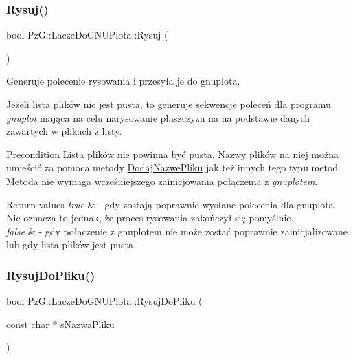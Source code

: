 \subsubsection{\texorpdfstring{Rysuj()}{Rysuj()}}
{\footnotesize\ttfamily bool Pz\+G\+::\+Lacze\+Do\+G\+N\+U\+Plota\+::\+Rysuj (\begin{DoxyParamCaption}{ }\end{DoxyParamCaption})}



Generuje polecenie rysowania i przesyła je do gnuplota. 

Jeżeli lista plików nie jest pusta, to generuje sekwencje poleceń dla programu {\itshape gnuplot} mająca na celu narysowanie płaszczyzn na na podstawie danych zawartych w plikach z listy.

\begin{DoxyPrecond}{Precondition}
Lista plików nie powinna być pusta. Nazwy plików na niej można umieścić za pomoca metody \mbox{\hyperlink{class_pz_g_1_1_lacze_do_g_n_u_plota_aa815ce8ec16e12fc246cf422e562869e}{Dodaj\+Nazwe\+Pliku}} jak też innych tego typu metod. Metoda nie wymaga wcześniejszego zainicjowania połączenia z {\itshape gnuplotem}. 
\end{DoxyPrecond}

\begin{DoxyRetVals}{Return values}
{\em true} & -\/ gdy zostają poprawnie wysłane polecenia dla gnuplota. Nie oznacza to jednak, że proces rysowania zakończył się pomyślnie. \\
\hline
{\em false} & -\/ gdy połączenie z gnuplotem nie może zostać poprawnie zainicjalizowane lub gdy lista plików jest pusta. \\
\hline
\end{DoxyRetVals}
\mbox{\label{class_pz_g_1_1_lacze_do_g_n_u_plota_aacb7ae45d283c741fb330f27b132e1a3}} 
\subsubsection{\texorpdfstring{RysujDoPliku()}{RysujDoPliku()}}
{\footnotesize\ttfamily bool Pz\+G\+::\+Lacze\+Do\+G\+N\+U\+Plota\+::\+Rysuj\+Do\+Pliku (\begin{DoxyParamCaption}\item[{const char $\ast$}]{s\+Nazwa\+Pliku }\end{DoxyParamCaption})}



